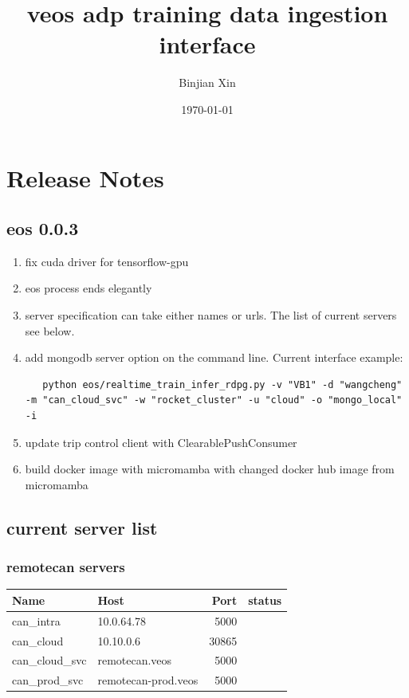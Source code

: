 \documentclass[a4paper, 11pt]{article}
\author{Binjian Xin}
\date{\today}
\title{veos adp training data ingestion interface}
\begin{document}
\maketitle
\tableofcontents

\section{Release Notes}
\label{sec:org569c4dc}

\subsection{eos 0.0.3}
\label{sec:org7af0af3}
\begin{enumerate}
\item fix cuda driver for tensorflow-gpu
\item eos process ends elegantly
\item server specification can take either names or urls. The list of current servers see below.
\item add mongodb server option on the command line. Current interface example:
\begin{verbatim}
   python eos/realtime_train_infer_rdpg.py -v "VB1" -d "wangcheng" -m "can_cloud_svc" -w "rocket_cluster" -u "cloud" -o "mongo_local" -i
\end{verbatim}
\item update trip control client with ClearablePushConsumer
\item build docker image with micromamba with changed docker hub image from micromamba
\end{enumerate}
\subsection{current server list}
\label{sec:orgbb381f6}
\subsubsection{remotecan servers}
\label{sec:orgba47732}
\begin{center}
\begin{tabular}{llrl}
Name & Host & Port & status\\
\hline
can\_intra & 10.0.64.78 & 5000 & \\
can\_cloud & 10.10.0.6 & 30865 & \\
can\_cloud\_svc & remotecan.veos & 5000 & \\
can\_prod\_svc & remotecan-prod.veos & 5000 & \\
\end{tabular}
\end{center}
\end{document}
